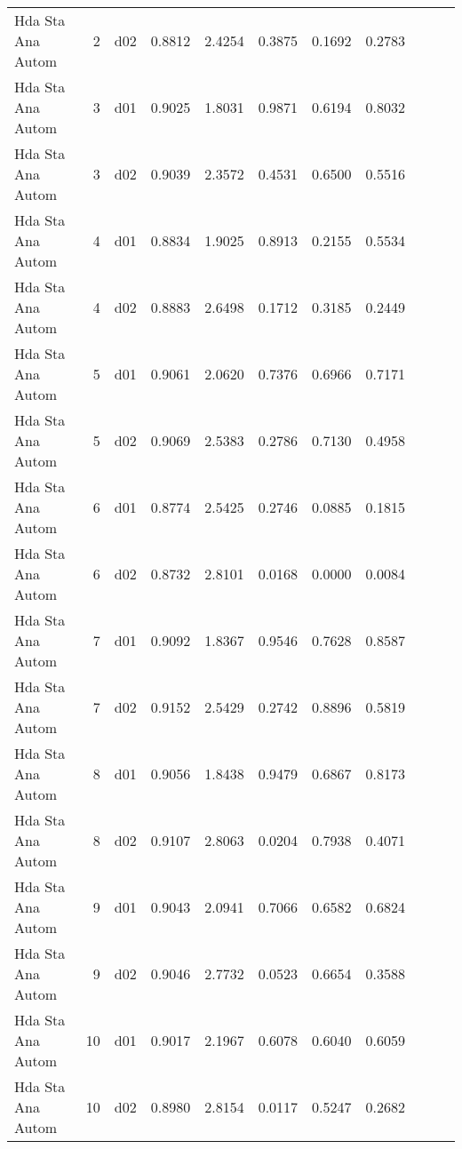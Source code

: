 \begin{landscape}
\begin{longtable}{p{2cm}rrrrrrrrrr}
       Hda Sta Ana Autom  &          2 &     d02 &   0.8812 &  2.4254 &        0.3875 &           0.1692 &  0.2783 \\
       Hda Sta Ana Autom  &          3 &     d01 &   0.9025 &  1.8031 &        0.9871 &           0.6194 &  0.8032 \\
       Hda Sta Ana Autom  &          3 &     d02 &   0.9039 &  2.3572 &        0.4531 &           0.6500 &  0.5516 \\
       Hda Sta Ana Autom  &          4 &     d01 &   0.8834 &  1.9025 &        0.8913 &           0.2155 &  0.5534 \\
       Hda Sta Ana Autom  &          4 &     d02 &   0.8883 &  2.6498 &        0.1712 &           0.3185 &  0.2449 \\
       Hda Sta Ana Autom  &          5 &     d01 &   0.9061 &  2.0620 &        0.7376 &           0.6966 &  0.7171 \\
       Hda Sta Ana Autom  &          5 &     d02 &   0.9069 &  2.5383 &        0.2786 &           0.7130 &  0.4958 \\
       Hda Sta Ana Autom  &          6 &     d01 &   0.8774 &  2.5425 &        0.2746 &           0.0885 &  0.1815 \\
       Hda Sta Ana Autom  &          6 &     d02 &   0.8732 &  2.8101 &        0.0168 &           0.0000 &  0.0084 \\
       Hda Sta Ana Autom  &          7 &     d01 &   0.9092 &  1.8367 &        0.9546 &           0.7628 &  0.8587 \\
       Hda Sta Ana Autom  &          7 &     d02 &   0.9152 &  2.5429 &        0.2742 &           0.8896 &  0.5819 \\
       Hda Sta Ana Autom  &          8 &     d01 &   0.9056 &  1.8438 &        0.9479 &           0.6867 &  0.8173 \\
       Hda Sta Ana Autom  &          8 &     d02 &   0.9107 &  2.8063 &        0.0204 &           0.7938 &  0.4071 \\
       Hda Sta Ana Autom  &          9 &     d01 &   0.9043 &  2.0941 &        0.7066 &           0.6582 &  0.6824 \\
       Hda Sta Ana Autom  &          9 &     d02 &   0.9046 &  2.7732 &        0.0523 &           0.6654 &  0.3588 \\
       Hda Sta Ana Autom  &         10 &     d01 &   0.9017 &  2.1967 &        0.6078 &           0.6040 &  0.6059 \\
       Hda Sta Ana Autom  &         10 &     d02 &   0.8980 &  2.8154 &        0.0117 &           0.5247 &  0.2682 \\

\end{longtable}
\end{landscape}
